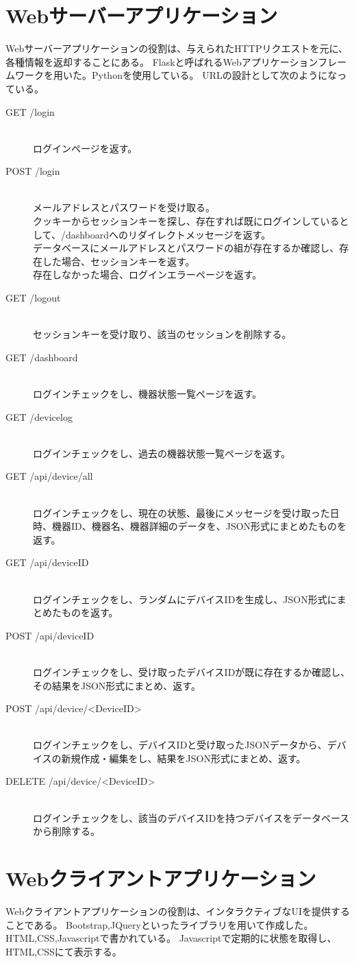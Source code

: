 \section{Webサーバーアプリケーション}
Webサーバーアプリケーションの役割は、与えられたHTTPリクエストを元に、各種情報を返却することにある。
Flaskと呼ばれるWebアプリケーションフレームワークを用いた。Pythonを使用している。
URLの設計として次のようになっている。
\begin{description}
	\item[GET /login]\mbox{}\\
		ログインページを返す。
	\item[POST /login]\mbox{}\\
		メールアドレスとパスワードを受け取る。\\
		クッキーからセッションキーを探し、存在すれば既にログインしているとして、/dashboardへのリダイレクトメッセージを返す。\\
		データベースにメールアドレスとパスワードの組が存在するか確認し、存在した場合、セッションキーを返す。\\
		存在しなかった場合、ログインエラーページを返す。
	\item[GET /logout]\mbox{}\\
		セッションキーを受け取り、該当のセッションを削除する。\\
	\item[GET /dashboard]\mbox{}\\
		ログインチェックをし、機器状態一覧ページを返す。
	\item[GET /devicelog]\mbox{}\\
		ログインチェックをし、過去の機器状態一覧ページを返す。
	\item[GET /api/device/all]\mbox{}\\
		ログインチェックをし、現在の状態、最後にメッセージを受け取った日時、機器ID、機器名、機器詳細のデータを、JSON形式にまとめたものを返す。
	\item[GET /api/deviceID]\mbox{}\\
		ログインチェックをし、ランダムにデバイスIDを生成し、JSON形式にまとめたものを返す。
	\item[POST /api/deviceID]\mbox{}\\
		ログインチェックをし、受け取ったデバイスIDが既に存在するか確認し、その結果をJSON形式にまとめ、返す。
	\item[POST /api/device/<DeviceID>]\mbox{}\\
		ログインチェックをし、デバイスIDと受け取ったJSONデータから、デバイスの新規作成・編集をし、結果をJSON形式にまとめ、返す。
	\item[DELETE /api/device/<DeviceID>]\mbox{}\\
		ログインチェックをし、該当のデバイスIDを持つデバイスをデータベースから削除する。	
\end{description}

\section{Webクライアントアプリケーション}
Webクライアントアプリケーションの役割は、インタラクティブなUIを提供することである。
Bootstrap,JQueryといったライブラリを用いて作成した。HTML,CSS,Javascriptで書かれている。
Javascriptで定期的に状態を取得し、HTML,CSSにて表示する。




